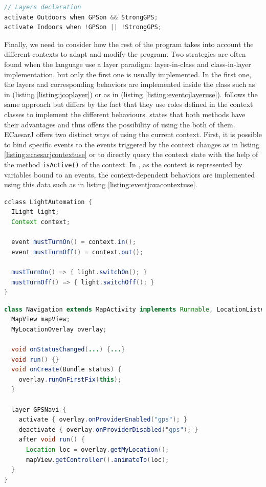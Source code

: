 \documentclass[a4paper]{article}
\begin{document}
\begin{lstlisting}[float, language=Java, caption=Javanese context declaration, label={listing:javaneselayer}]
// Layers declaration
activate Outdoors when GPSon && StrongGPS;
activate Indoors when !GPSon || !StrongGPS;
\end{lstlisting}

Finally, we need to consider how the rest of the program takes into account the different contexts to adapt and modify the program. Two strategies are often found when the language use a layer paradigm: layer-in-class and class-in-layer implementation, but only the first one is usually implemented. In the first one, the layers and corresponding behaviors are implemented inside the class such as in \cite{appeltauer_improving_2009} \cite{appeltauer_declarative_2013} \cite{wasty_contextlua:_2010} (listing \ref{listing:jcoplayer}) or as in \cite{kamina_eventcj:_2011} \cite{kamina_unified_2013} (listing \ref{listing:eventcjlayeruse}). \cite{kamina_towards_2009} follows the same approach but differs by the fact that they use roles defined in the context classes to implement the different behaviours. \cite{ghezzi_context_2010} states that both methods have their advantages and thus offers the possibility of using the both of them. ECaesarJ offers two distinct ways of using the current context. First, it is possible to bind specific events to the events triggered by the context changes as in listing \ref{listing:ecaesarjcontextuse} or to directly query the context state with the help of the method \lstinline|isActive()| of the context. In \cite{jayaram_context-oriented_2009}, as the context is represented by variables bound to an events, the context-dependent behaviors are implemented using this data such as in listing \ref{listing:eventjavacontextuse}.

\begin{lstlisting}[float, language=Java, caption=ECaesarJ context use, label={listing:ecaesarjcontextuse}]
cclass LightAutomation {
  ILight light;
  Context context;

  event mustTurnOn() = context.in();
  event mustTurnOff() = context.out();

  mustTurnOn() => { light.switchOn(); }
  mustTurnOff() => { light.switchOff(); }
}
\end{lstlisting}

\begin{lstlisting}[float, language=Java, caption=EventCJ context-dependent behaviour, label={listing:eventcjlayeruse}]
class Navigation extends MapActivity implements Runnable, LocationListener {
  MapView mapView;
  MyLocationOverlay overlay;
    
  void onStatusChanged(...) {...}
  void run() {}
  void onCreate(Bundle status) {
    overlay.runOnFirstFix(this);
  }
  
  layer GPSNavi {
    activate { overlay.onProviderEnabled("gps"); }
    deactivate { overlay.onProviderDisabled("gps"); }
    after void run() {
      Location loc = overlay.getMyLocation();
      mapView.getController().animateTo(loc);
  }
}
\end{lstlisting}
\end{document}
